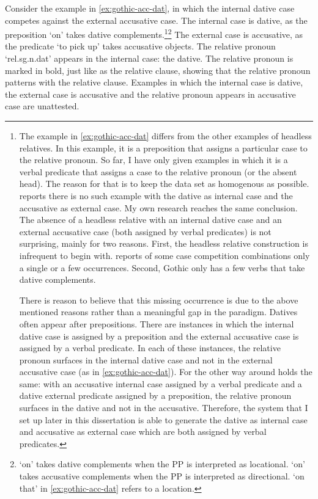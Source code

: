 Consider the example in \ref{ex:gothic-acc-dat}, in which the internal dative case competes against the external accusative case.
The internal case is dative, as the preposition  `on' takes dative complements.\footnote{
The example in \ref{ex:gothic-acc-dat} differs from the other examples of headless relatives. In this example, it is a preposition that assigns a particular case to the relative pronoun. So far, I have only given examples in which it is a verbal predicate that assigns a case to the relative pronoun (or the absent head). The reason for that is to keep the data set as homogenous as possible. \citet{harbert1978} reports there is no such example with the dative as internal case and the accusative as external case. My own research reaches the same conclusion. The absence of a headless relative with an internal dative case and an external accusative case (both assigned by verbal predicates) is not surprising, mainly for two reasons. First, the headless relative construction is infrequent to begin with. \citeauthor{harbert1978} reports of some case competition combinations only a single or a few occurrences.
Second, Gothic only has a few verbs that take dative complements.

There is reason to believe that this missing occurrence is due to the above mentioned reasons rather than a meaningful gap in the paradigm. Datives often appear after prepositions. There are instances in which the internal dative case is assigned by a preposition and the external accusative case is assigned by a verbal predicate. In each of these instances, the relative pronoun surfaces in the internal dative case and not in the external accusative case (as in \ref{ex:gothic-acc-dat}). For the other way around holds the same: with an accusative internal case assigned by a verbal predicate and a dative external predicate assigned by a preposition, the relative pronoun surfaces in the dative and not in the accusative. Therefore, the system that I set up later in this dissertation is able to generate the dative as internal case and accusative as external case which are both assigned by verbal predicates.
}\footnote{
 `on' takes dative complements when the PP is interpreted as locational.  `on' takes accusative complements when the PP is interpreted as directional.  `on that' in \ref{ex:gothic-acc-dat} refers to a location.
}
The external case is accusative, as the predicate  `to pick up' takes accusative objects.
The relative pronoun  `\ac{rel}.\ac{sg}.\ac{n}.\ac{dat}' appears in the internal case: the dative. The relative pronoun is marked in bold, just like as the relative clause, showing that the relative pronoun patterns with the relative clause.
Examples in which the internal case is dative, the external case is accusative and the relative pronoun appears in accusative case are unattested.

